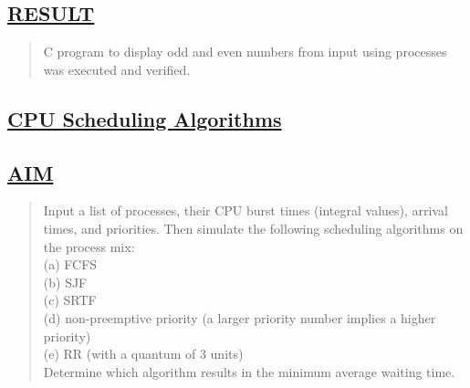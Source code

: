 \documentclass[a4paper, 12pt]{article}
\begin{document}
\begin{figure}[H] 
    \centering
\end{figure}


\subsection*{\underline{RESULT}}
\begin{quote}
C program to display odd and even numbers from input using processes was executed and verified.
\end{quote}

\newpage
\begin{center}
\section*{\LARGE \textbf{\underline{CPU Scheduling Algorithms}}} 
\end{center}

\subsection*{\underline{AIM}}
\begin{quote}
Input a list of processes, their CPU burst times (integral values), arrival times, and
priorities. Then simulate the following scheduling algorithms on the process mix:\\
(a) FCFS\\
(b) SJF\\
(c) SRTF\\
(d) non-preemptive priority (a larger priority number implies a higher priority)\\
(e) RR (with a quantum of 3 units)\\
Determine which algorithm results in the minimum average waiting time.
\end{quote}
\end{document}
